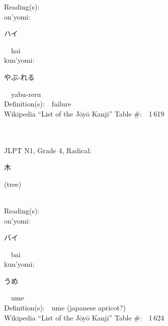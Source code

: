 \begin{multicols}{2}
Reading(s):\ \ \\
{\hspace*{1em}}on'yomi:\ \ \\
{\hspace*{2em}}{\begin{CJK}{UTF8}{min} ハイ \end{CJK}}\ \ hai\ \ \\
{\hspace*{1em}}kun'yomi:\ \ \\
{\hspace*{2em}}{\begin{CJK}{UTF8}{min} やぶ-れる \end{CJK}}\ \ yabu-reru\ \ \\
Definition(s):\ \ failure \\
Wikipedia ``List of the J\=oy\=o Kanji'' Table \#:\ \ 1\,619 \\
\ \ \\
{\fontsize{34pt}{40pt}  }\ \ \\  %
{JLPT N1, Grade 4, Radical:\ \ {\begin{CJK}{UTF8}{min} 木 \end{CJK}} (tree) } \\
Reading(s):\ \ \\
{\hspace*{1em}}on'yomi:\ \ \\
{\hspace*{2em}}{\begin{CJK}{UTF8}{min} バイ \end{CJK}}\ \ bai\ \ \\
{\hspace*{1em}}kun'yomi:\ \ \\
{\hspace*{2em}}{\begin{CJK}{UTF8}{min} うめ \end{CJK}}\ \ ume\ \ \\
Definition(s):\ \ ume (japanese apricot?) \\
Wikipedia ``List of the J\=oy\=o Kanji'' Table \#:\ \ 1\,624 \\
\ \ \\
{\fontsize{34pt}{40pt}  }\ \ \\  %

\end{multicols}

